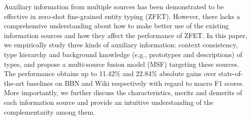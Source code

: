 Auxiliary information from multiple sources has been demonstrated to be effective in zero-shot fine-grained entity typing (ZFET). However, there lacks a comprehensive understanding about how to make better use of the existing information sources and how they affect the performance of ZFET. In this paper, we empirically study three kinds of auxiliary information: context consistency, type hierarchy and background knowledge (e.g., prototypes and descriptions) of types, and propose a multi-source fusion model (MSF) targeting these sources. The performance obtains up to 11.42\% and 22.84\% absolute gains over state-of-the-art baselines on BBN and Wiki respectively with regard to macro F1 scores. More importantly, we further discuss the characteristics, merits and demerits of each information source and provide an intuitive understanding of the complementarity among them.
